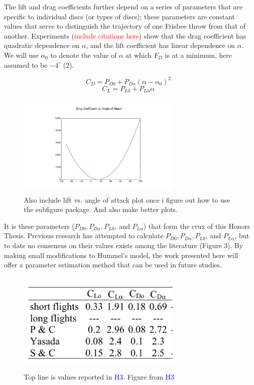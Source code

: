 \documentclass[a4paper,12pt, oneside]{article}
\newcommand{\red}[1]{\textcolor{red}{#1}}
\newcommand{\blue}[1]{\textcolor{blue}{#1}}
\begin{document}
The lift and drag coefficients further depend on a series of parameters that are specific to individual discs (or types of discs); these parameters are constant values that serve to distinguish the trajectory of one Frisbee throw from that of another.  Experiments (\red{include citations here}) show that the drag coefficient has quadratic dependence on $\alpha$, and the lift coefficient has linear dependence on $\alpha$. We will use $\alpha_0$ to denote the value of $\alpha$ at which $F_D$ is at a minimum, here assumed to be $-4^{\circ}$ (2).

\begin{equation}
  C_D=P_{D0}+P_{D\alpha}(\alpha-\alpha_0)^2
\end{equation}
\begin{equation}
  C_L=P_{L0}+P_{L\alpha}\alpha
\end{equation}
\begin{figure}[H]
	\centering
	\includegraphics[width=8cm, height=5cm]{DragCoefficientPlot}
	\caption{\color{red}Also include lift vs. angle of attack plot once i figure out how to use the subfigure package. And also make better plots. \color{black}}
\end{figure}
It is these parameters ($P_{D0}, P_{D\alpha}, P_{L0}$, and $P_{L\alpha}$) that form the crux of this Honors Thesis. Previous research has attempted to calculate $P_{D0}, P_{D\alpha}, P_{L0}$, and $P_{L\alpha}$, but to date no consensus on their values exists among the literature (Figure 3). By making small modifications to Hummel's model, the work presented here will offer a parameter estimation method that can be used in future studies.

\begin{figure}[H]
	\centering
	\includegraphics[width=8cm, height=5cm]{ParameterValues}
	\caption{\color{red}Top line is values reported in \blue{H3}. Figure from \blue{H3} \color{black}}
\end{figure}
\end{document}
